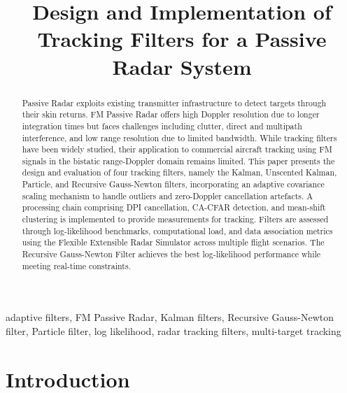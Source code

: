 \documentclass[conference]{IEEEtran}
\begin{document}
\title{Design and Implementation of Tracking Filters for a Passive Radar System}

\author{
}

\maketitle

\begin{abstract}
Passive Radar exploits existing transmitter infrastructure to detect targets through their skin returns. FM Passive Radar offers high Doppler resolution due to longer integration times but faces challenges including clutter, direct and multipath interference, and low range resolution due to limited bandwidth. While tracking filters have been widely studied, their application to commercial aircraft tracking using FM signals in the bistatic range-Doppler domain remains limited. This paper presents the design and evaluation of four tracking filters, namely the Kalman, Unscented Kalman, Particle, and Recursive Gauss-Newton filters, incorporating an adaptive covariance scaling mechanism to handle outliers and zero-Doppler cancellation artefacts. A processing chain comprising DPI cancellation, CA-CFAR detection, and mean-shift clustering is implemented to provide measurements for tracking. Filters are assessed through log-likelihood benchmarks, computational load, and data association metrics using the Flexible Extensible Radar Simulator across multiple flight scenarios. The Recursive Gauss-Newton Filter achieves the best log-likelihood performance while meeting real-time constraints.
\end{abstract}

\begin{IEEEkeywords}
adaptive filters, FM Passive Radar, Kalman filters, Recursive Gauss-Newton filter, Particle filter, log likelihood, radar tracking filters, multi-target tracking
\end{IEEEkeywords}

\section{Introduction}
\end{document}
